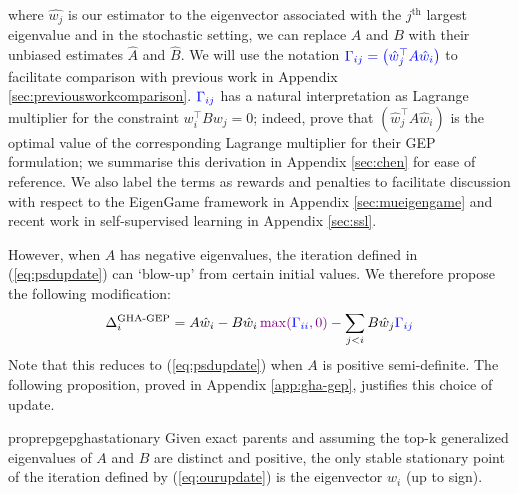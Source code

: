 where $\hat{w_j}$ is our estimator to the eigenvector associated with the $j^{\text{th}}$ largest eigenvalue and in the stochastic setting, we can replace $A$ and $B$ with their unbiased estimates $\hat{A}$ and $\hat{B}$.
We will use the notation $\textcolor{blue}{\Gamma_{ij}=\left(\hat{w}_{j}^{\top} A \hat{w}_{i}\right)}$ to facilitate comparison with previous work in Appendix \ref{sec:previousworkcomparison}.  $\textcolor{blue}{\Gamma_{ij}}$ has a natural interpretation as Lagrange multiplier for the constraint $w_i^\top B w_j = 0$; indeed, \citet{chen2019constrained} prove that $\left(\hat{w}_{j}^{\top} A \hat{w}_{i}\right)$ is the optimal value of the corresponding Lagrange multiplier for their GEP formulation; we summarise this derivation in Appendix \ref{sec:chen} for ease of reference.
We also label the terms as rewards and penalties to facilitate discussion with respect to the EigenGame framework in Appendix \ref{sec:mueigengame} and recent work in self-supervised learning in Appendix \ref{sec:ssl}.

However, when $A$ has negative eigenvalues, the iteration defined in (\ref{eq:psdupdate}) can `blow-up' from certain initial values. We therefore propose the following modification:
\begin{equation}\label{eq:ourupdate}
        \Delta_{i}^{\text{GHA-GEP}}=
        A \hat{w}_{i} - B\hat{w}_{i}\,\textcolor{violet}{\max(}\textcolor{blue}{\Gamma_{ii}}\textcolor{violet}{,0)} - \sum_{j < i}B\hat{w}_{j}\textcolor{blue}{\Gamma_{ij}}
    \end{equation}
Note that this reduces to (\ref{eq:psdupdate}) when $A$ is positive semi-definite. The following proposition, proved in Appendix \ref{app:gha-gep}, justifies this choice of update.

\begin{restatable}{proprep}{gepghastationary}
\label{prop:gep-gha-stat}
Given exact parents and assuming the top-k generalized eigenvalues
of $A$ and $B$ are distinct and positive, the only stable stationary point of the iteration defined by (\ref{eq:ourupdate}) is the eigenvector $w_i$ (up to sign).
\end{restatable}


